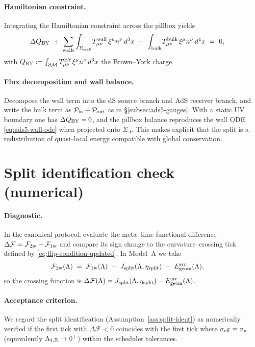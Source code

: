 \documentclass[10pt]{article}
\theoremstyle{definition}
\theoremstyle{plain}
\begin{document}
\paragraph{Hamiltonian constraint.}\label{par:uom-main-207}
Integrating the Hamiltonian constraint across the pillbox yields
\[
\Delta Q_{\rm BY}\ +\ \sum_{\rm walls}\int_{\Sigma_{\rm wall}}\!T^{\rm wall}_{\mu\nu}\,\xi^\mu n^\nu\,d^3x
\ +\ \int_{\rm bulk}\!T^{\rm bulk}_{\mu\nu}\,\xi^\mu n^\nu\,d^4x\ =\ 0,
\]
with $Q_{\rm BY}:=\int_{\partial\mathcal M}T^{\rm BY}_{\mu\nu}\xi^\mu n^\nu\,d^3x$ the Brown--York charge.

\paragraph{Flux decomposition and wall balance.}\label{par:uom-main-208}
Decompose the wall term into the dS source branch and AdS receiver branch, and write the bulk term as
$\mathcal P_{\rm in}-\mathcal P_{\rm out}$ as in \S\ref{subsec:ads5-gauges}. With a static UV boundary
one has $\Delta Q_{\rm BY}=0$, and the pillbox balance reproduces the wall ODE
\eqref{eq:ads5-wall-ode} when projected onto $\Sigma_\Lambda$. This makes explicit that the split is a
redistribution of quasi--local energy compatible with global conservation.

\section{Split identification check (numerical)}
\label{app:split-check}

\paragraph{Diagnostic.}\label{par:uom-main-209}
In the canonical protocol, evaluate the meta--time functional difference
$\Delta\mathcal F=\mathcal F_{2{\rm w}}-\mathcal F_{1{\rm w}}$ and compare its sign change to the
curvature--crossing tick defined by \eqref{eq:flip-condition-updated}. In Model~A we take
\[
\mathcal F_{2{\rm w}}(\Lambda)\;=\;\mathcal F_{1{\rm w}}(\Lambda)\;+\;J_{\rm split}(\Lambda,\eta_{\rm split})\;-\;E^{\rm src}_{\rm geom}(\Lambda),
\]
so the crossing function is $\Delta\mathcal F(\Lambda)=J_{\rm split}(\Lambda,\eta_{\rm split})-E^{\rm src}_{\rm geom}(\Lambda)$.

\paragraph{Acceptance criterion.}\label{par:uom-main-210}
We regard the split identification (Assumption~\ref{ass:split-ident}) as numerically verified if
the first tick with $\Delta\mathcal F<0$ coincides with the first tick where
$\sigma_{\rm eff}=\sigma_\star$ (equivalently $\Lambda_{4,{\rm R}}\to0^+$) within the scheduler tolerances.
\end{document}
